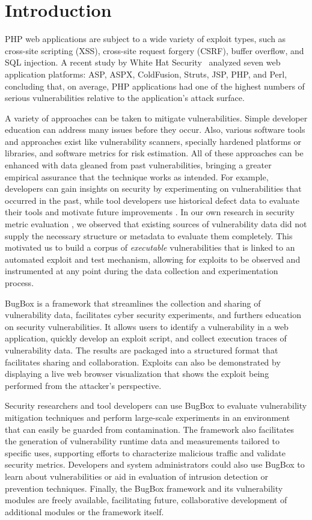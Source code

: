 \documentclass[letterpaper,twocolumn,10pt]{article}
\begin{document}
\section{Introduction}
PHP web applications are subject to a wide variety of exploit types, such as cross-site scripting (XSS), cross-site request forgery (CSRF), buffer overflow, and SQL injection.  A recent study by White Hat Security~\cite{WhiteHat:2010:Online} analyzed seven web application platforms: ASP, ASPX, ColdFusion, Struts, JSP, PHP, and Perl, concluding that, on average, PHP applications had one of the highest numbers of serious vulnerabilities relative to the application's attack surface.

A variety of approaches can be taken to mitigate vulnerabilities. Simple developer education can address many issues before they occur. Also, various software tools and approaches exist like vulnerability scanners, specially hardened platforms or libraries, and software metrics for risk estimation. All of these approaches can be enhanced with data gleaned from past vulnerabilities, bringing a greater empirical assurance that the technique works as intended. For example, developers can gain insights on security by experimenting on vulnerabilities that occurred in the past, while tool developers use historical defect data to evaluate their tools and motivate future improvements \cite{miningbugfinding}. In our own research in security metric evaluation \cite{metrisec2012surface}, we observed that existing sources of vulnerability data did not supply the necessary structure or metadata to evaluate them completely. This motivated us to build a corpus of \textit{executable} vulnerabilities that is linked to an automated exploit and test mechanism, allowing for exploits to be observed and instrumented at any point during the data collection and experimentation process.

BugBox is a framework that streamlines the collection and sharing of vulnerability data, facilitates cyber security experiments, and furthers education on security vulnerabilities. It allows users to identify a vulnerability in a web application, quickly develop an exploit script, and collect execution traces of vulnerability data. The results are packaged into a structured format that facilitates sharing and collaboration. Exploits can also be demonstrated by displaying a live web browser visualization that shows the exploit being performed from the attacker's perspective.

Security researchers and tool developers can use BugBox to evaluate vulnerability mitigation techniques and perform large-scale experiments in an environment that can easily be guarded from contamination. The framework also facilitates the generation of vulnerability runtime data and measurements tailored to specific uses, supporting efforts to characterize malicious traffic and validate security metrics. Developers and system administrators could also use BugBox to learn about vulnerabilities or aid in evaluation of intrusion detection or prevention techniques. Finally, the BugBox framework and its vulnerability modules are freely available, facilitating future, collaborative development of additional modules or the framework itself.
\end{document}
